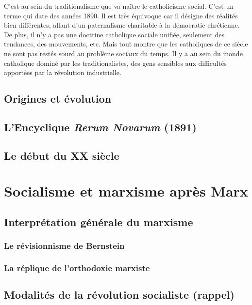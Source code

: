 \documentclass[12pt]{report}
\begin{document}
C’est au sein du traditionalisme que va naître le catholicisme social. C'est un terme qui date des années
1890. Il est très équivoque car il désigne des réalités bien différentes, allant d’un paternalisme charitable à la
démocratie chrétienne. De plus, il n’y a pas une doctrine catholique sociale unifiée,
seulement des tendances, des mouvements, etc. Mais tout montre que les catholiques de ce
siècle ne sont pas restés sourd au problème sociaux du temps. Il y a au sein du monde catholique
dominé par les traditionalistes, des gens sensibles aux difficultés apportées par la révolution
industrielle.


\subsection{Origines et évolution}

\subsection{L'Encyclique \emph{Rerum Novarum} (1891)}

\subsection{Le début du XX siècle}

\section{Socialisme et marxisme après Marx}

\subsection{Interprétation générale du marxisme}

\subsubsection{Le révisionnisme de Bernstein}

\subsubsection{La réplique de l'orthodoxie marxiste}

\subsection{Modalités de la révolution socialiste (rappel)}
\end{document}
